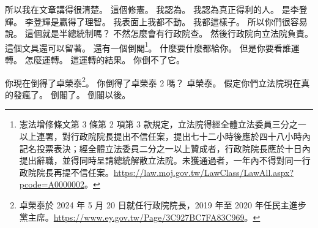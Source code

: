 \hypertarget{w01:cue:2360}{}所以我在文章講得很清楚。
\hypertarget{w01:cue:2361}{}這個修憲。
\hypertarget{w01:cue:2362}{}我認為。
\hypertarget{w01:cue:2363}{}我認為真正得利的人。
\hypertarget{w01:cue:2364}{}是李登輝。
\hypertarget{w01:cue:2365}{}李登輝是贏得了理智。
\hypertarget{w01:cue:2366}{}我表面上我都不動。
\hypertarget{w01:cue:2367}{}我都這樣子。
\hypertarget{w01:cue:2368}{}所以你們很容易說。
\hypertarget{w01:cue:2369}{}這個就是半總統制嗎？
\hypertarget{w01:cue:2370}{}不然怎麼會有行政院查。
\hypertarget{w01:cue:2371}{}然後行政院向立法院負責。
\hypertarget{w01:cue:2372}{}這個文具還可以留著。
\hypertarget{w01:cue:2373}{}還有一個倒閣\footnote{憲法增修條文第 3 條第 2 項第 3 款規定，立法院得經全體立法委員三分之一以上連署，對行政院院長提出不信任案，提出七十二小時後應於四十八小時內記名投票表決；經全體立法委員二分之一以上贊成者，行政院院長應於十日內提出辭職，並得同時呈請總統解散立法院。未獲通過者，一年內不得對同一行政院院長再提不信任案。\url{https://law.moj.gov.tw/LawClass/LawAll.aspx?pcode=A0000002}。}。
\hypertarget{w01:cue:2374}{}什麼要什麼都給你。
\hypertarget{w01:cue:2375}{}但是你要看誰運轉。
\hypertarget{w01:cue:2376}{}怎麼運轉。
\hypertarget{w01:cue:2377}{}這運轉的結果。
\hypertarget{w01:cue:2378}{}你倒不了它。

\hypertarget{w01:cue:2379}{}你現在倒得了卓榮泰\footnote{卓榮泰於 2024 年 5 月 20 日就任行政院院長，2019 年至 2020 年任民主進步黨主席。\url{https://www.ey.gov.tw/Page/3C927BC7FA83C969}。}。
\hypertarget{w01:cue:2380}{}你倒得了卓榮泰 2 嗎？
\hypertarget{w01:cue:2381}{}卓榮泰。
\hypertarget{w01:cue:2382}{}假定你們立法院現在真的發瘋了。
\hypertarget{w01:cue:2383}{}倒閣了。
\hypertarget{w01:cue:2384}{}倒閣以後。

